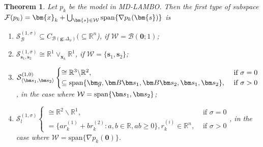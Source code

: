 \documentclass[colorlinks=true, linkcolor=blue, citecolor=blue, urlcolor=blue]{article}
\theoremstyle{plain}
\newtheorem{theorem}{Theorem}[section]
\theoremstyle{definition}
\theoremstyle{remark}
\newcommand{\RR}{\mathbb{R}}
\begin{document}
\begin{theorem}\label{thm: sp. gene. by cup+span}
    Let $p_k$ be the model in MD-LAMBO. Then the first type of subspace $\mathcal{F}(p_k)=\bm{x}_k+\bigcup_{\bm{s}\in \mathcal{W}} {\rm span}\{\nabla p_k(\bm{s})\}$ is
    \begin{enumerate}
        \item $\mathcal{S}_{\mathcal{B}}^{(1,\sigma)}\subseteq C_{\mathcal{B}(\bm g;\Delta_\sigma)}(\subseteq\mathbb{R}^n$), if   $\mathcal{W}=\mathcal{B}(\bm 0;1)$;
        
        \item $\mathcal{S}_{\bm s_1,\bm s_2}^{(1,\sigma)}\cong\mathbb{R}^1\vee_{\bm x_k}\mathbb{R}^1$, if $\mathcal{W}=\{\bm s_1,\bm s_2\}$;   \item$\mathcal{S}_{\langle\bm s_1,\bm s_2\rangle}^{(1,0)}
            \begin{cases}     \cong\mathbb{R}^3\backslash\mathbb{R}^2,&\text{ if }\sigma =0\\
                \subseteq{\rm span}\{\bm g,\bm B\bm s_1,\bm B\bm s_2,\bm s_1,\bm s_2\},&\text{ if }\sigma>0
            \end{cases}$, in the case where $\mathcal{W}={\rm span}\{\bm s_1,\bm s_2\}$;   \item$\mathcal{S}_{l}^{(1,\sigma)}\begin{cases}
            \cong\RR^2\backslash\RR^1,&\text{ if }\sigma=0\\
            =\{ar_k^{(1)}+br_k^{(2)}:a,b\in\RR, ab\geq 0\},r_k^{(i)}\in\RR^n,&\text{ if }\sigma>0
        \end{cases}$, in the case where $\mathcal{W}=\mathrm{span}\{\nabla p_k(\bm 0)\}$.
    \end{enumerate}
\end{theorem}
\end{document}
